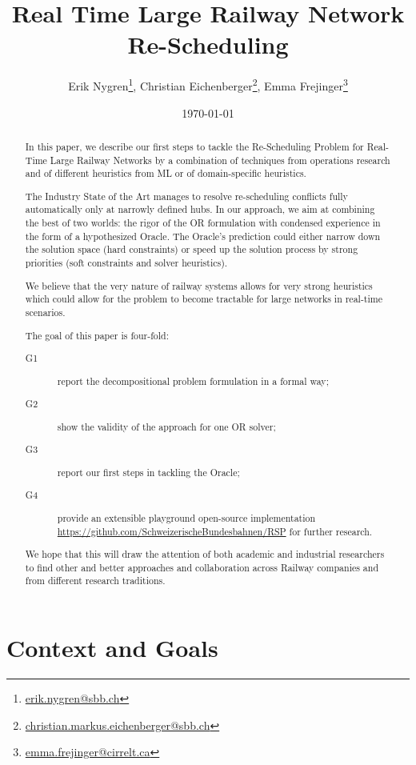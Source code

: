 \documentclass{article}
\title{Real Time Large Railway Network Re-Scheduling}
\author{Erik Nygren\footnote{\url{erik.nygren@sbb.ch}}, Christian Eichenberger\footnote{\url{christian.markus.eichenberger@sbb.ch}}, Emma Frejinger\footnote{\url{emma.frejinger@cirrelt.ca}}}
\date{\today}
\begin{document}
\maketitle

\tableofcontents
\begin{abstract}
In this paper, we describe our first steps to tackle the Re-Scheduling Problem for Real-Time Large Railway Networks by a combination of techniques from operations research and of different heuristics from ML or of domain-specific heuristics.

The Industry State of the Art manages to resolve re-scheduling conflicts fully automatically only at narrowly defined hubs. In our approach, we aim at combining the best of two worlds: the rigor of the OR formulation with condensed experience in the form of a hypothesized Oracle. The Oracle's prediction could either narrow down the solution space (hard constraints) or speed up the solution process by strong priorities (soft constraints and solver heuristics).

We believe that the very nature of railway systems allows for very strong heuristics which could allow for the problem to become tractable for large networks in real-time scenarios.

The goal of this paper is four-fold:
\begin{description}
\item[G1] report the decompositional problem formulation in a formal way;
\item[G2] show the validity of the approach for one OR solver;
\item[G3] report our first steps in tackling the Oracle;
\item[G4] provide an extensible playground open-source implementation \url{https://github.com/SchweizerischeBundesbahnen/RSP} for further research.
\end{description}
 We hope that this will draw the attention of both academic and industrial researchers to find other and better approaches and collaboration across Railway companies and from different research traditions.
\end{abstract}



\section{Context and Goals}
\end{document}
